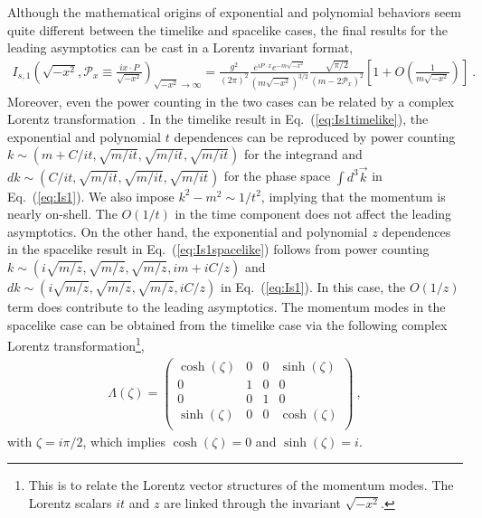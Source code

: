 \documentclass[a4paper,11pt]{article}
\begin{document}
Although the mathematical origins of exponential and polynomial behaviors seem quite different between the timelike and spacelike cases, the final results for the leading asymptotics can be cast in a Lorentz invariant format,
\begin{align}
I_{s,1}\left(\sqrt{-x^2}, \mathcal{P}_x \equiv \frac{i x \cdot P}{\sqrt{-x^2}} \right)_{\sqrt{-x^2}\rightarrow\infty} = \frac{g^2}{(2\pi)^2} \frac{e^{i P \cdot x}e^{-m\sqrt{-x^2}}}{(m\sqrt{-x^2})^{3/2}} \frac{\sqrt{\pi/2}}{(m-2 \mathcal{P}_x)^2} \left[1+O\left(\frac{1}{m \sqrt{-x^2}}\right)\right] \ .
\end{align}
Moreover, even the power counting in the two cases can be related by a complex Lorentz transformation~\cite{Streater:1989vi}. In the timelike result in Eq.~(\ref{eq:Is1timelike}), the exponential and polynomial $t$ dependences can be reproduced by power counting $k\sim\left(m+C/it,\sqrt{m/it},\sqrt{m/it},\sqrt{m/it}\right)$ for the integrand and $d k\sim\left(C/it,\sqrt{m/it} ,\sqrt{m/it},\sqrt{m/it}\right)$ for the phase space $\int d^3 \vec{k}$ in Eq.~(\ref{eq:Is1}). We also impose $k^2 - m^2 \sim 1/t^2$, implying that the momentum is nearly on-shell. The $O(1/t)$ in the time component does not affect the leading asymptotics. On the other hand, the exponential and polynomial $z$ dependences in the spacelike result in Eq.~(\ref{eq:Is1spacelike}) follows from power counting $k\sim\left(i\sqrt{m/z},\sqrt{m/z},\sqrt{m/z},i m +iC/z\right)$ and $d k\sim\left(i\sqrt{m/z},\sqrt{m/z},\sqrt{m/z},iC/z\right)$ in Eq.~(\ref{eq:Is1}). In this case, the $O\left(1/z\right)$ term does contribute to the leading asymptotics. The momentum modes in the spacelike case can be obtained from the timelike case via the following complex Lorentz transformation\footnote{This is to relate the Lorentz vector structures of the momentum modes. The Lorentz scalars $i t$ and $z$ are linked through the invariant $\sqrt{-x^2}$.},
\begin{align}
    \Lambda(\zeta) = \left(
\begin{array}{cccc}
 \cosh (\zeta) & 0 & 0 & \sinh (\zeta ) \\
 0 & 1 & 0 & 0 \\
 0 & 0 & 1 & 0 \\
 \sinh (\zeta ) & 0 & 0 & \cosh (\zeta ) \\
\end{array}
\right) \ ,
\end{align}
with $\zeta= i \pi/2$, which implies $\cosh (\zeta)=0$ and $\sinh (\zeta )=i$.
\end{document}
